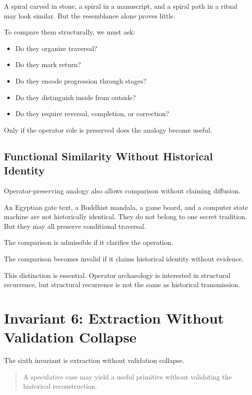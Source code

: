 \documentclass[11pt]{book}
\begin{document}
A spiral carved in stone, a spiral in a manuscript, and a spiral path in a ritual may look similar. But the resemblance alone proves little.

To compare them structurally, we must ask:

\begin{itemize}
    \item Do they organize traversal?
    \item Do they mark return?
    \item Do they encode progression through stages?
    \item Do they distinguish inside from outside?
    \item Do they require reversal, completion, or correction?
\end{itemize}

Only if the operator role is preserved does the analogy become useful.

\subsection{Functional Similarity Without Historical Identity}

Operator-preserving analogy also allows comparison without claiming diffusion.

An Egyptian gate text, a Buddhist mandala, a game board, and a computer state machine are not historically identical. They do not belong to one secret tradition. But they may all preserve conditional traversal.

The comparison is admissible if it clarifies the operation.

The comparison becomes invalid if it claims historical identity without evidence.

This distinction is essential. Operator archaeology is interested in structural recurrence, but structural recurrence is not the same as historical transmission.

\section{Invariant 6: Extraction Without Validation Collapse}

The sixth invariant is extraction without validation collapse.

\begin{quote}
A speculative case may yield a useful primitive without validating the historical reconstruction.
\end{quote}
\end{document}
